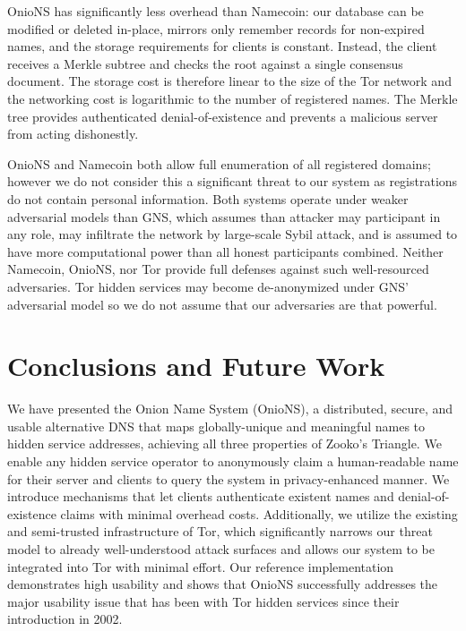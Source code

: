 \documentclass[USenglish,oneside,twocolumn]{article}
\begin{document}
OnioNS has significantly less overhead than Namecoin: our database can be modified or deleted in-place, mirrors only remember records for non-expired names, and the storage requirements for clients is constant. Instead, the client receives a Merkle subtree and checks the root against a single consensus document. The storage cost is therefore linear to the size of the Tor network and the networking cost is logarithmic to the number of registered names. The Merkle tree provides authenticated denial-of-existence and prevents a malicious server from acting dishonestly.

OnioNS and Namecoin both allow full enumeration of all registered domains; however we do not consider this a significant threat to our system as registrations do not contain personal information. Both systems operate under weaker adversarial models than GNS, which assumes than attacker may participant in any role, may infiltrate the network by large-scale Sybil attack, and is assumed to have more computational power than all honest participants combined. Neither Namecoin, OnioNS, nor Tor provide full defenses against such well-resourced adversaries. Tor hidden services may become de-anonymized under GNS' adversarial model so we do not assume that our adversaries are that powerful. %

\section{Conclusions and Future Work}

We have presented the Onion Name System (OnioNS), a distributed, secure, and usable alternative DNS that maps globally-unique and meaningful names to hidden service addresses, achieving all three properties of Zooko's Triangle. We enable any hidden service operator to anonymously claim a human-readable name for their server and clients to query the system in privacy-enhanced manner. We introduce mechanisms that let clients authenticate existent names and denial-of-existence claims with minimal overhead costs. Additionally, we utilize the existing and semi-trusted infrastructure of Tor, which significantly narrows our threat model to already well-understood attack surfaces and allows our system to be integrated into Tor with minimal effort. Our reference implementation demonstrates high usability and shows that OnioNS successfully addresses the major usability issue that has been with Tor hidden services since their introduction in 2002.
\end{document}
